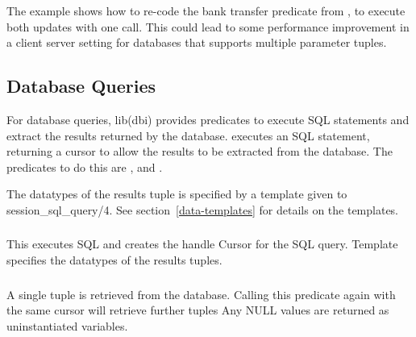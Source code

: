 The example shows how to re-code the bank transfer predicate from
,
to execute
both updates with one call. This could lead to some performance
improvement in a client server setting for databases that supports multiple
parameter tuples.

\subsection{Database Queries}

For database queries, lib(dbi) provides predicates to execute SQL
statements and extract the results returned by the database.
executes an SQL statement, returning a cursor to allow the results to be
extracted from the database. The predicates to do this are
,
 and
.

The datatypes of the results tuple is specified by a template given to
session_sql_query/4. See section~\ref{data-templates} for details on the
templates.  

\subsubsection
{}
\label{session-sql-query/5}

This executes SQL and creates the handle Cursor for the SQL query. Template
specifies the datatypes of the results tuples.

\subsubsection
{}
\label{cursor-next-tuple/2}

A single tuple is retrieved from the database.  Calling this
predicate again with the same cursor will retrieve further tuples
Any NULL values are returned as uninstantiated variables.

